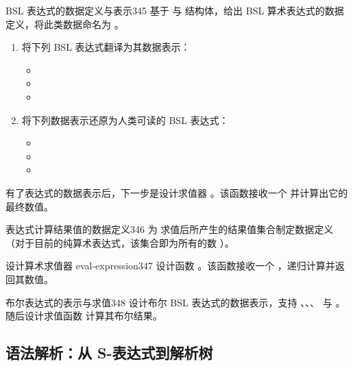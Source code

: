 \begin{exercise}{BSL 表达式的数据定义与表示}{345}
基于  与  结构体，给出 BSL 算术表达式的数据定义，将此类数据命名为 。
\begin{enumerate}
  \item 将下列 BSL 表达式翻译为其数据表示：
  \begin{itemize}
    \item {}
    \item {}
    \item {}
  \end{itemize}
  \item 将下列数据表示还原为人类可读的 BSL 表达式：
  \begin{itemize}
    \item {}
    \item {}
    \item {}
  \end{itemize}
\end{enumerate}
\end{exercise}

有了表达式的数据表示后，下一步是设计求值器 。该函数接收一个  并计算出它的最终数值。

\begin{exercise}{表达式计算结果值的数据定义}{346}
为  求值后所产生的结果值集合制定数据定义（对于目前的纯算术表达式，该集合即为所有的数 ）。
\end{exercise}

\begin{exercise}{设计算术求值器 eval-expression}{347}
设计函数 。该函数接收一个 ，递归计算并返回其数值。
\end{exercise}

\begin{exercise}{布尔表达式的表示与求值}{348}
设计布尔 BSL 表达式的数据表示，支持 、、、 与 。随后设计求值函数  计算其布尔结果。
\end{exercise}

\subsection{语法解析：从 S-表达式到解析树}

